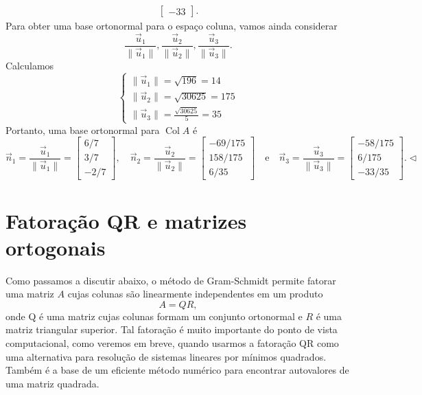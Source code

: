 \begin{ex}
\begin{align*}
\begin{bmatrix}
 -33
\end{bmatrix}.
  \end{align*}
  Para obter uma base ortonormal para o espaço coluna, vamos ainda considerar
\begin{equation}
\frac{\vec{u}_1}{\|\vec{u}_1\|}, \frac{\vec{u}_2}{\|\vec{u}_2\|}, \frac{\vec{u}_3}{\|\vec{u}_3\|}.
\end{equation} Calculamos
\begin{equation}
\left\{
  \begin{array}{ll}
   \|\vec{u}_1\| = \sqrt{196} = 14 \\
   \|\vec{u}_2\| = \sqrt{30625} = 175 \\
   \|\vec{u}_3\| = \frac{\sqrt{30625}}{5} = 35
  \end{array}
\right.
\end{equation} Portanto, uma base ortonormal para $\operatorname{Col} A$ é
\begin{equation}
\vec{n}_1 = \frac{\vec{u}_1}{\|\vec{u}_1\|} =
\begin{bmatrix}
 6/7  \\
 3/7  \\
 -2/7
\end{bmatrix}, \quad
\vec{n}_2 = \frac{\vec{u}_2}{\|\vec{u}_2\|} =
\begin{bmatrix}
 -69/175  \\
 158/175  \\
 6/35
\end{bmatrix} \quad \text{e} \quad
\vec{n}_3 = \frac{\vec{u}_3}{\|\vec{u}_3\|} =
\begin{bmatrix}
 -58/175  \\
 6/175  \\
 -33/35
\end{bmatrix}. \lhd
\end{equation}
\end{ex}


\section{Fatoração QR e matrizes ortogonais}


Como passamos a discutir abaixo, o método de Gram-Schmidt permite fatorar uma matriz $A$ cujas colunas são linearmente independentes em um produto \begin{equation}A=QR,\end{equation} onde Q é uma matriz cujas colunas formam um conjunto ortonormal e $R$ é uma matriz triangular superior. Tal fatoração é muito importante do ponto de vista computacional, como veremos em breve, quando usarmos a fatoração QR como uma alternativa para resolução de sistemas lineares por mínimos quadrados. Também é a base de um eficiente método numérico para encontrar autovalores de uma matriz quadrada.

